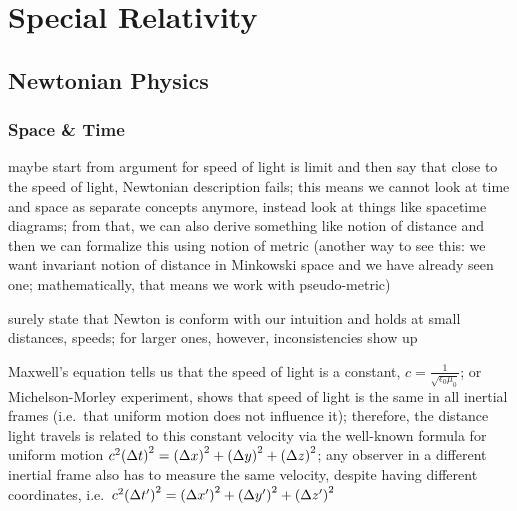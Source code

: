 




\chapter{Special Relativity}

	\section{Newtonian Physics}
		\subsection{Space \& Time}
maybe start from argument for speed of light is limit and then say that close to the speed of light, Newtonian description fails; this means we cannot look at time and space as separate concepts anymore, instead look at things like spacetime diagrams; from that, we can also derive something like notion of distance and then we can formalize this using notion of metric (another way to see this: we want invariant notion of distance in Minkowski space and we have already seen one; mathematically, that means we work with pseudo-metric)


surely state that Newton is conform with our intuition and holds at small distances, speeds; for larger ones, however, inconsistencies show up



Maxwell's equation tells us that the speed of light is a constant, $c = \frac{1}{\sqrt{\epsilon_0 \mu_0}}$; or Michelson-Morley experiment, shows that speed of light is the same in all inertial frames (i.e.~that uniform motion does not influence it); therefore, the distance light travels is related to this constant velocity via the well-known formula for uniform motion $c^2 \qty(\Delta t)^2 = \qty(\Delta x)^2 + \qty(\Delta y)^2 + \qty(\Delta z)^2$; any observer in a different inertial frame also has to measure the same velocity, despite having different coordinates, i.e.~$c^2 \qty(\Delta t')^2 = \qty(\Delta x')^2 + \qty(\Delta y')^2 + \qty(\Delta z')^2$

